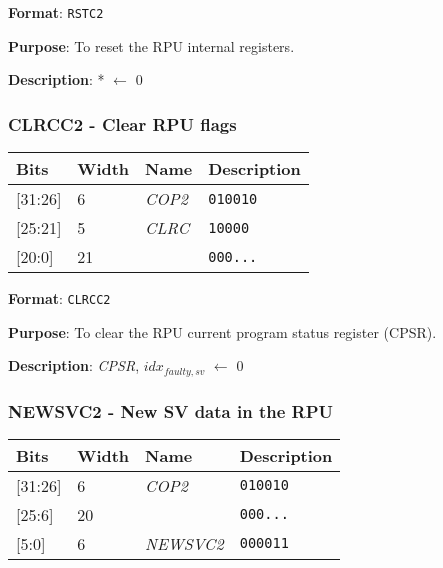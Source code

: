 \documentclass[11pt]{article}
\begin{document}
\textbf{Format}: \texttt{RSTC2}

\textbf{Purpose}: To reset the RPU internal registers.

\textbf{Description}: * $\leftarrow$ 0

\text{}
\subsubsection{CLRCC2 - Clear RPU flags}
\text{}

\begin{table}[H] \centering
  \def\arraystretch{1.4}
  \begin{tabular}{|m{2cm}|m{1.5cm}|m{2.5cm}|m{4.5cm}|}
    \hline
    \textbf{Bits} & \textbf{Width} & \textbf{Name} & \textbf{Description}\\ \hline

    [31:26] & 6 & \emph{COP2} & \texttt{010010}\\ \hline

    [25:21] & 5 & \emph{CLRC} & \texttt{10000}\\ \hline

    [20:0] & 21 & & \texttt{000...}\\ \hline
  \end{tabular}
\end{table}

\textbf{Format}: \texttt{CLRCC2}

\textbf{Purpose}: To clear the RPU current program status register (CPSR).

\textbf{Description}: \emph{CPSR}, $idx_{faulty,sv}$ $\leftarrow$ 0

\text{}
\subsubsection{NEWSVC2 - New SV data in the RPU}
\text{}

\begin{table}[H] \centering
  \def\arraystretch{1.4}
  \begin{tabular}{|m{2cm}|m{1.5cm}|m{2.5cm}|m{4.5cm}|}
    \hline
    \textbf{Bits} & \textbf{Width} & \textbf{Name} & \textbf{Description}\\ \hline

    [31:26] & 6 & \emph{COP2} & \texttt{010010}\\ \hline

    [25:6] & 20 & & \texttt{000...}\\ \hline

    [5:0] & 6 & \emph{NEWSVC2} & \texttt{000011}\\ \hline
  \end{tabular}
\end{table}
\end{document}

